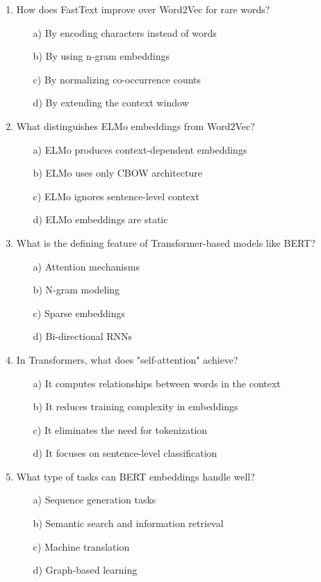 \documentclass[8pt]{extarticle}
\begin{document}
\begin{multicols}{2}
\begin{enumerate}
\item How does FastText improve over Word2Vec for rare words?
\begin{itemize}
\item[a)] By encoding characters instead of words
\item[b)] By using n-gram embeddings
\item[c)] By normalizing co-occurrence counts
\item[d)] By extending the context window
\end{itemize}

\item What distinguishes ELMo embeddings from Word2Vec?
\begin{itemize}
\item[a)] ELMo produces context-dependent embeddings
\item[b)] ELMo uses only CBOW architecture
\item[c)] ELMo ignores sentence-level context
\item[d)] ELMo embeddings are static
\end{itemize}

\item What is the defining feature of Transformer-based models like BERT?
\begin{itemize}
\item[a)] Attention mechanisms
\item[b)] N-gram modeling
\item[c)] Sparse embeddings
\item[d)] Bi-directional RNNs
\end{itemize}

\item In Transformers, what does "self-attention" achieve?
\begin{itemize}
\item[a)] It computes relationships between words in the context
\item[b)] It reduces training complexity in embeddings
\item[c)] It eliminates the need for tokenization
\item[d)] It focuses on sentence-level classification
\end{itemize}

\item What type of tasks can BERT embeddings handle well?
\begin{itemize}
\item[a)] Sequence generation tasks
\item[b)] Semantic search and information retrieval
\item[c)] Machine translation
\item[d)] Graph-based learning
\end{itemize}


\end{enumerate}
\end{multicols}
\end{document}
